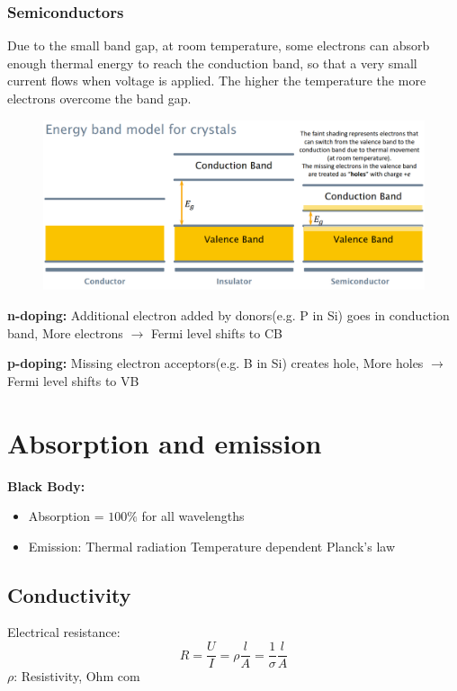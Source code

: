 \subsubsection{Semiconductors}
Due to the small band gap, at room temperature, some electrons can absorb enough thermal energy to reach the conduction band, so that a very small current flows when voltage is applied.
The higher the temperature the more electrons overcome the band gap.
\begin{figure}[h]
    \centering
    \includegraphics[width=\columnwidth]{images/bandmodel2.png}
    \label{fig:bandmodel2}
\end{figure}

\textbf{n-doping:} Additional electron added by donors(e.g. P in Si) goes in conduction band, More electrons \(\rightarrow\) Fermi level shifts to CB

\textbf{p-doping:} Missing electron acceptors(e.g. B in Si) creates hole, More holes \(\rightarrow\) Fermi level shifts to VB

\section{Absorption and emission}
\textbf{Black Body:}
\begin{itemize}
    \item Absorption = \(100\%\) for all wavelengths
    \item Emission:
    \subitem Thermal radiation
    \subitem Temperature dependent
    \subitem Planck's law 
\end{itemize}


 \subsection{Conductivity}
 Electrical resistance:
 \[
 R = \frac{U}{I}= \rho\frac{l}{A} = \frac{1}{\sigma}\frac{l}{A}
 \]
 \(\rho\): Resistivity, Ohm com
 
